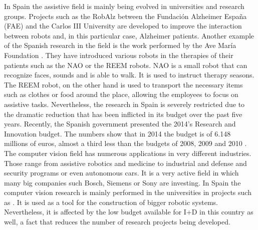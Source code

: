 In Spain the assistive field is mainly being evolved in universities and research groups. 
Projects such as the RobAlz between the Fundación Alzheimer España (FAE) and the Carlos III University \cite{robalz} are developed to improve the interaction between robots and, in this particular case, Alzheimer patients.  
Another example of the Spanish research in the field is the work performed by the Ave María Foundation \cite{assistive_spain}.
They have introduced various robots in the therapies of their patients such as the NAO or the REEM robots. 
NAO is a small robot that can recognize faces, sounds and is able to walk. 
It is used to instruct therapy seasons. 
The REEM robot, on the other hand is used to transport the necessary items such as clothes or food around the place, allowing the employees to focus on assistive tasks. 
Nevertheless, the research in Spain is severely restricted due to the dramatic reduction that has been inflicted in its budget over the past five years. 
Recently, the Spanish government presented the 2014's Research and Innovation budget.
The numbers show that in 2014 the budget is of 6.148 millions of euros, almost a third less than the budgets of 2008, 2009 and 2010 \cite{budget_i_mas_d}.
\\

The computer vision field has numerous applications in very different industries. 
Those range from assistive robotics and medicine to industrial and defense and security programs or even autonomous cars.
It is a very active field in which many big companies such Bosch, Siemens or Sony are investing. 
In Spain the computer vision research is mainly performed in the universities in projects such as \cite{robalz}. 
It is used as a tool for the construction of bigger robotic systems. 
Nevertheless, it is affected by the low budget available for I+D in this country as well, a fact that reduces the number of research projects being developed. 




